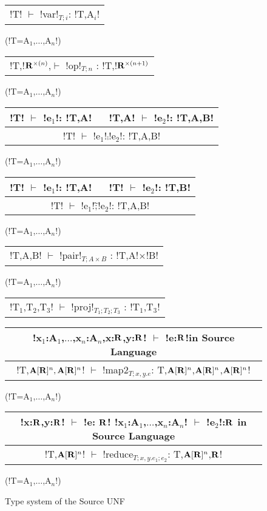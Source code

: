 \begin{figure*}[tb]
    \centering
    \begin{tabular}{c} 
    \\\hline
    !T! $\vdash$ !var!$_{T;i}$: !T,A$_i$!
    \end{tabular}(!T=A$_{1}$,$\ldots$,A$_n$!)
    \hspace{0.5cm}
    \begin{tabular}{c}
        \\\hline
        !T,!$\mathbf{R}^{\times(n)}$,$\vdash$ !op!$_{T;n}$ : !T,!$\mathbf{R}^{\times(n+1)}$
    \end{tabular}(!T=A$_{1}$,$\ldots$,A$_n$!)

    \begin{tabular}{c}
    !T! $\vdash$ !e$_{1}$!: !T,A! $\quad$ !T,A! $\vdash$ !e$_{2}$!: !T,A,B! \\\hline
    !T! $\vdash$ !e$_{1}$!$\comp$!e$_{2}$!: !T,A,B!
    \end{tabular}(!T=A$_{1}$,$\ldots$,A$_n$!)
    \hspace{0.5cm}
    \begin{tabular}{c}
        !T! $\vdash$ !e$_{1}$!: !T,A! $\quad$ !T! $\vdash$ !e$_{2}$!: !T,B! \\\hline
        !T! $\vdash$ !e$_{1}$!$\widetilde{;}$!e$_{2}$!: !T,A,B!
    \end{tabular}(!T=A$_{1}$,$\ldots$,A$_n$!)

    \begin{tabular}{c}
        \\\hline
        !T,A,B! $\vdash$ !pair!$_{T;A\times B}$ : !T,A!$\times$!B!
    \end{tabular}(!T=A$_{1}$,$\ldots$,A$_n$!)

    \begin{tabular}{c}
        \\\hline
        !T$_{1}$,T$_{2}$,T$_{3}$! $\vdash$ !proj!$_{T_1;T_2;T_3}$ : !T$_{1}$,T$_{3}$!
    \end{tabular}

    \begin{tabular}{c}
        !x$_{1}$:A$_{1}$,$\ldots$,x$_n$:A$_n$,x:$\mathbf{R}$,y:$\mathbf{R}$! $\vdash$ !e:$\mathbf{R}$!\quad in Source Language
        \\\hline  
        !T,$\mathbf{A}[\mathbf{R}]^{n},\mathbf{A}[\mathbf{R}]^{n}$! $\vdash$ !map2$_{T; x,y.e}$: T,$\mathbf{A}[\mathbf{R}]^{n}$,$\mathbf{A}[\mathbf{R}]^{n}$,$\mathbf{A}[\mathbf{R}]^{n}$!
    \end{tabular}(!T=A$_{1}$,$\ldots$,A$_n$!)

    \begin{tabular}{c}
        !x:$\mathbf{R}$,y:$\mathbf{R}$! $\vdash$ !e: $\mathbf{R}$! \quad !x$_{1}$:A$_{1}$,$\ldots$,x$_n$:A$_n$! $\vdash$ !e$_{2}$!:$\mathbf{R}$ \quad in Source Language
        \\\hline  
        !T,$\mathbf{A}[\mathbf{R}]^{n}$! $\vdash$ !reduce$_{T; x,y.e_1; e_2}$: T,$\mathbf{A}[\mathbf{R}]^{n}$,$\mathbf{R}$!
    \end{tabular}(!T=A$_{1}$,$\ldots$,A$_n$!)
    \vspace{-0.2cm}
    \caption{Type system of the Source UNF}
    \vspace{-0.4cm}
    \label{fig:source_unf_typesystem}
\end{figure*}
